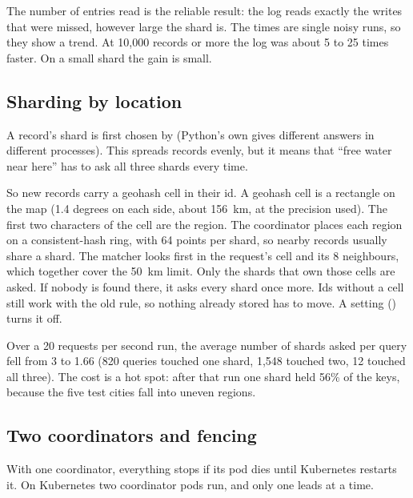 \documentclass[a4paper,10pt]{article}
\newcommand{\code}[1]{\texttt{\detokenize{#1}}}
\begin{document}
The number of entries read is the reliable result: the log reads exactly the writes that were
missed, however large the shard is. The times are single noisy runs, so they show a trend. At
10,000 records or more the log was about 5 to 25 times faster. On a small shard the gain is
small.

\subsection{Sharding by location}
\label{sec:geo}

A record's shard is first chosen by \code{sha1(key) mod 3} (Python's own \code{hash()} gives
different answers in different processes). This spreads records evenly, but it means that
``free water near here'' has to ask all three shards every time.

So new records carry a geohash cell in their id. A geohash cell is a rectangle on the map
(1.4 degrees on each side, about 156~km, at the precision used). The first two characters of
the cell are the region. The coordinator places each region on a consistent-hash ring, with 64
points per shard, so nearby records usually share a shard. The matcher looks first in the
request's cell and its 8 neighbours, which together cover the 50~km limit. Only the shards that
own those cells are asked. If nobody is found there, it asks every shard once more. Ids without a
cell still work with the old rule, so nothing already stored has to move. A setting
(\code{GEO_SHARDING=false}) turns it off.

Over a 20 requests per second run, the average number of shards asked per query fell from 3 to
1.66 (820 queries touched one shard, 1,548 touched two, 12 touched all three). The cost is a hot
spot: after that run one shard held 56\% of the keys, because the five test cities fall into
uneven regions.

\subsection{Two coordinators and fencing}

With one coordinator, everything stops if its pod dies until Kubernetes restarts it. On
Kubernetes two coordinator pods run, and only one leads at a time.
\end{document}

